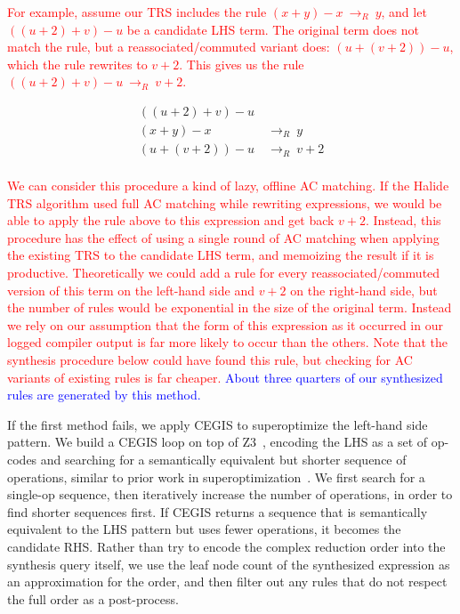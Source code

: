 \documentclass[acmsmall,review]{acmart}\settopmatter{printfolios=true,printccs=false,printacmref=false}
\newcommand{\modified}[1]{\textcolor{red}{{#1}}}
\newcommand{\modifiedagain}[1]{\textcolor{blue}{{#1}}}
\newcommand{\rewrites}[0]{\:\rightarrow_{R}\:}
\begin{document}
\modified{For example, assume our TRS includes the rule $(x + y) - x \rewrites y$, 
and let $((u + 2) + v) - u$ be a candidate LHS term. The original term does not match
the rule, but a reassociated/commuted variant does: $(u + (v + 2)) - u$, which the rule 
rewrites to $v + 2$. This gives us the rule $((u + 2) + v) - u \rewrites v + 2$. }

\begin{equation*}
\begin{split}
\boxed{((u + 2) + v) - u} &  \\
(x + y) - x & \rewrites  y \\
(u + (v + 2)) - u & \rewrites  \boxed{v + 2} \\
\end{split}
\end{equation*}

\modified{We can consider this procedure a kind of lazy, offline AC matching. If the Halide TRS algorithm 
used full AC matching while rewriting expressions, we would be able to apply the rule above to this 
expression and get back $v + 2$. Instead, this procedure has the effect of using a single 
round of AC matching when applying the existing TRS to the candidate LHS term, and 
memoizing the result if it is productive. Theoretically we could add a rule for every reassociated/commuted 
version of this term on the left-hand side and $v + 2$ on the right-hand side, but 
the number of rules would be exponential in the size of the original term. Instead 
we rely on our assumption that the form of this expression as it occurred in our logged 
compiler output is far more likely to occur than the others.
Note that the synthesis procedure below could have found this rule, but checking for AC
variants of existing rules is far cheaper.} \modifiedagain{About three quarters of our synthesized rules are generated by this method.}

If the first method fails, we apply CEGIS to superoptimize the left-hand side pattern.
We build a CEGIS loop on top of Z3~\cite{de2008z3}, encoding the LHS as a set of op-codes
and searching for a semantically equivalent but shorter sequence of operations, similar
to prior work in superoptimization~\cite{regehr2018superoptimization, mangpo2016superoptimization}.
We first search for a single-op sequence,
then iteratively increase the number of operations, in order to find shorter sequences
first.  If CEGIS returns a sequence that is semantically equivalent to the LHS pattern but uses fewer
operations, it becomes the candidate RHS. Rather than try to encode the complex reduction order into the synthesis query itself, we use the leaf node count of the synthesized expression as an approximation for the order, and then filter out any rules that do not respect the full order as a post-process. 
\end{document}
